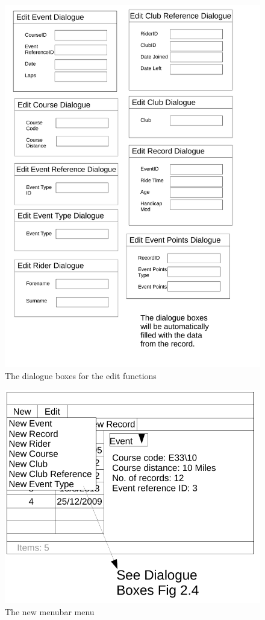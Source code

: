 \begin{figure}[H]
	\includegraphics[width=\textwidth]{./UIDesign/EditDialogs.pdf}
	\caption{The dialogue boxes for the edit functions} \label{fig:The dialogue boxes for the edit functions} 	
\end{figure}


\begin{figure}[H]
	\includegraphics[width=\textwidth]{./UIDesign/DatebaseMainNewDrop.pdf}
	\caption{The new menubar menu} \label{fig:The new menubar menu} 	
\end{figure}


